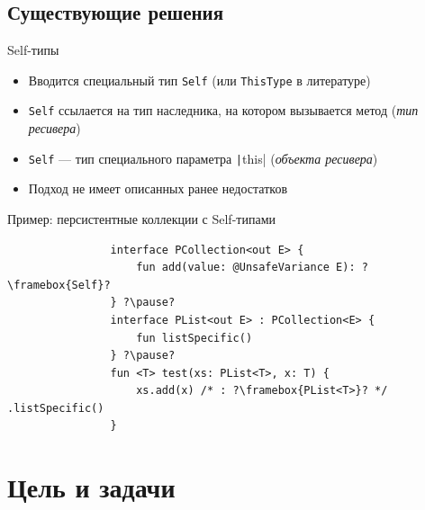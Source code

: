 \documentclass[handout,aspectratio=169,usenames,dvipsnames]{beamer}
\begin{document}
    \subsection{Существующие решения}

    \begin{frame}[fragile]{Self-типы}


        \begin{itemize}
            \item Вводится специальный тип \texttt{Self} (или \texttt{ThisType} в литературе)
            \item \texttt{Self} ссылается на тип наследника, на котором вызывается метод (\emph{тип ресивера})
            \item \texttt{Self} --- тип специального параметра \texttt|this| (\emph{объекта ресивера})
            \item Подход не имеет описанных ранее недостатков
        \end{itemize}

        \pause

        \begin{block}{Пример: персистентные коллекции с Self-типами}
            \begin{verbatim}
                interface PCollection<out E> {
                    fun add(value: @UnsafeVariance E): ?\framebox{Self}?
                } ?\pause?
                interface PList<out E> : PCollection<E> {
                    fun listSpecific()
                } ?\pause?
                fun <T> test(xs: PList<T>, x: T) {
                    xs.add(x) /* : ?\framebox{PList<T>}? */ .listSpecific()
                }
            \end{verbatim}
        \end{block}
    \end{frame}


    \section{Цель и задачи}
\end{document}
